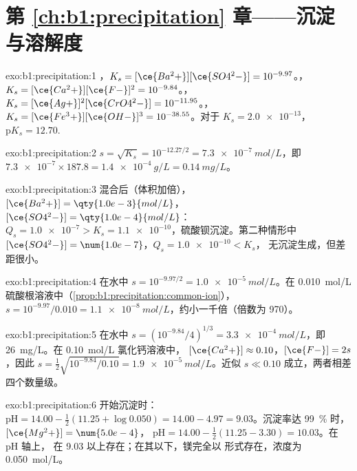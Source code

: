 \section*{第 \ref{ch:b1:precipitation} 章——沉淀与溶解度}

\begin{solution}{exo:b1:precipitation:1}
，$K_s = [\ce{Ba^2+}][\ce{SO4^2-}] =
10^{-9.97}$。，$K_s = [\ce{Ca^2+}][\ce{F-}]^2 =
10^{-9.84}$。，$K_s =
[\ce{Ag+}]^2[\ce{CrO4^2-}] = 10^{-11.95}$。，
$K_s = [\ce{Fe^3+}][\ce{OH-}]^3 = 10^{-38.55}$。对于 $K_s = \num{2.0e-13}$，
$\mathrm{p}K_s = 12.70$.
\end{solution}

\begin{solution}{exo:b1:precipitation:2}
$s = \sqrt{K_s} = 10^{-12.27/2} = \qty{7.3e-7}{mol/L}$，即
$\num{7.3e-7} \times 187.8 = \qty{1.4e-4}{g/L} = \qty{0.14}{mg/L}$。
\end{solution}

\begin{solution}{exo:b1:precipitation:3}
混合后（体积加倍），$[\ce{Ba^2+}] = \qty{1.0e-3}{mol/L}$，
$[\ce{SO4^2-}] = \qty{1.0e-4}{mol/L}$：$Q_s = \num{1.0e-7} > K_s =
\num{1.1e-10}$，硫酸钡沉淀。第二种情形中
$[\ce{SO4^2-}] = \num{1.0e-7}$，$Q_s = \num{1.0e-10} < K_s$，
无沉淀生成，但差距很小。
\end{solution}

\begin{solution}{exo:b1:precipitation:4}
在水中 $s = 10^{-9.97/2} = \qty{1.0e-5}{mol/L}$。在 \qty{0.010}{mol/L}
硫酸根溶液中（\cref{prop:b1:precipitation:common-ion}），$s = 10^{-9.97}/0.010 =
\qty{1.1e-8}{mol/L}$，约小一千倍（倍数为 970）。
\end{solution}

\begin{solution}{exo:b1:precipitation:5}
在水中 $s = (10^{-9.84}/4)^{1/3} = \qty{3.3e-4}{mol/L}$，即
\qty{26}{mg/L}。在 \qty{0.10}{mol/L} 氯化钙溶液中，
$[\ce{Ca^2+}] \approx 0.10$，$[\ce{F-}] = 2s$，因此
$s = \frac12\sqrt{10^{-9.84}/0.10} = \qty{1.9e-5}{mol/L}$。近似
$s \ll 0.10$ 成立，两者相差四个数量级。
\end{solution}

\begin{solution}{exo:b1:precipitation:6}
开始沉淀时：$\mathrm{pH} = 14.00 - \frac12(11.25 + \log 0.050) = 14.00 - 4.97 =
9.03$。沉淀率达 \qty{99}{\percent} 时，$[\ce{Mg^2+}] = \num{5.0e-4}$，
$\mathrm{pH} = 14.00 - \frac12(11.25 - 3.30) = 10.03$。在 pH 轴上，
 在 9.03 以上存在；在其以下，镁完全以 
形式存在，浓度为 \qty{0.050}{mol/L}。
\end{solution}

